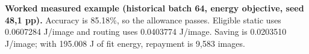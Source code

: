 \textbf{Worked measured example (historical batch 64, energy objective, seed 48,1 pp).} Accuracy is 85.18\%, so the allowance passes. Eligible static uses 0.0607284 J/image and routing uses 0.0403774 J/image. Saving is 0.0203510 J/image; with 195.008 J of fit energy, repayment is 9,583 images.
